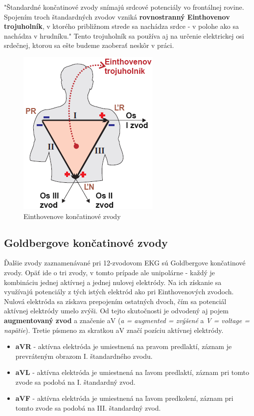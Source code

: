 "Štandardné končatinové zvody snímajú srdcové potenciály vo frontálnej rovine. Spojením troch štandardných zvodov vzniká \textbf{rovnostranný Einthovenov trojuholník}, v ktorého približnom strede sa nachádza srdce - v polohe ako sa nachádza v hrudníku."\cite{Bada2010} Tento trojuholník sa používa aj na určenie elektrickej osi srdečnej, ktorou sa ešte budeme zaoberať neskôr v práci.

\begin{figure}[H]
    \centering
    \includegraphics[scale=0.6]{img/einthoven-triangle.png}
    \caption{Einthovenove končatinové zvody\cite{Blahút_2017a}}
    \label{fig:einthoven}
\end{figure}

\subsection{Goldbergove končatinové zvody}

Ďalšie zvody zaznamenávané pri 12-zvodovom EKG sú Goldbergove končatinové zvody. Opäť ide o tri zvody, v tomto prípade ale unipolárne - každý je kombináciu jednej aktívnej a jednej nulovej elektródy. Na ich získanie sa využívajú potenciály z tých istých elektród ako pri Einthovenových zvodoch. Nulová elektróda sa získava prepojením ostatných dvoch, čím sa potenciál aktívnej elektródy umelo zvýši. Od tejto skutočnosti je odvodený aj pojem \textbf{augmentovaný zvod} a značenie aV (\textit{a = augmented = zvýšené} a \textit{V = voltage = napätie}). Tretie písmeno za skratkou aV značí pozíciu aktívnej elektródy.

\begin{itemize}
    \item \textbf{aVR} - aktívna elektróda je umiestnená na pravom predlaktí, záznam je prevráteným obrazom I. štandardného zvodu.
    \item \textbf{aVL} - aktívna elektróda je umiestnená na ľavom predlaktí, záznam pri tomto zvode sa podobá na I. štandardný zvod.
    \item \textbf{aVF} - aktívna elektróda je umiestnená na ľavom predkolení, záznam pri tomto zvode sa podobá na III. štandardný zvod.\cite{Bada2010}\cite{garcia201512} 
\end{itemize}

